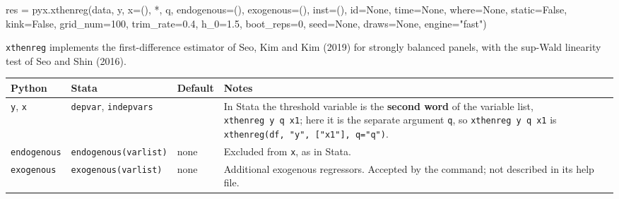 \documentclass[
  10.5pt,
  a4paper,
]{article}
\newenvironment{Shaded}{}{}
\newcommand{\NormalTok}[1]{#1}
\newcounter{none} %
\begin{document}
\begin{Shaded}
\begin{Highlighting}[]
\NormalTok{res = pyx.xthenreg(data, y, x=(), *, q, endogenous=(), exogenous=(), inst=(),}
\NormalTok{                   id=None, time=None, where=None, static=False, kink=False,}
\NormalTok{                   grid\_num=100, trim\_rate=0.4, h\_0=1.5, boot\_reps=0, seed=None, draws=None,}
\NormalTok{                   engine="fast")}
\end{Highlighting}
\end{Shaded}

\texttt{xthenreg} implements the first-difference estimator of Seo, Kim
and Kim (2019) for strongly balanced panels, with the sup-Wald linearity
test of Seo and Shin (2016).

{\def\LTcaptype{none} %
\begin{longtable}[]{@{}
  >{\raggedright\arraybackslash}p{}
  >{\raggedright\arraybackslash}p{}
  >{\raggedright\arraybackslash}p{}
  >{\raggedright\arraybackslash}p{}@{}}
\toprule\noalign{}
\begin{minipage}[b]{\linewidth}\raggedright
Python
\end{minipage} & \begin{minipage}[b]{\linewidth}\raggedright
Stata
\end{minipage} & \begin{minipage}[b]{\linewidth}\raggedright
Default
\end{minipage} & \begin{minipage}[b]{\linewidth}\raggedright
Notes
\end{minipage} \\
\midrule\noalign{}
\endhead
\bottomrule\noalign{}
\endlastfoot
\texttt{y}, \texttt{x} & \texttt{depvar}, \texttt{indepvars} & & In
Stata the threshold variable is the \textbf{second word} of the variable
list, \texttt{xthenreg\ y\ q\ x1}; here it is the separate argument
\texttt{q}, so \texttt{xthenreg\ y\ q\ x1} is
\texttt{xthenreg(df,\ "y",\ {[}"x1"{]},\ q="q")}. \\
\texttt{endogenous} & \texttt{endogenous(varlist)} & none & Excluded
from \texttt{x}, as in Stata. \\
\texttt{exogenous} & \texttt{exogenous(varlist)} & none & Additional
exogenous regressors. Accepted by the command; not described in its help
file. \\

\end{longtable}}
\end{document}

